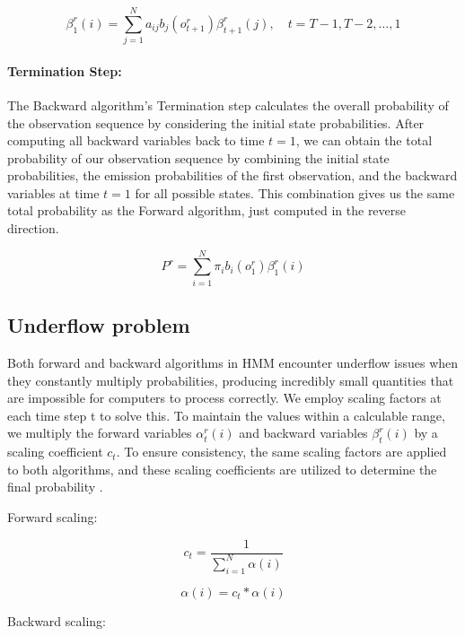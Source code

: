 \documentclass{article}
\begin{document}
\begin{equation}
\beta^r_1(i) = \sum^N_{j=1}a_{ij}b_j(o^r_{t+1})\beta^r_{t+1}(j), \quad t = T-1, T-2, \ldots, 1
\end{equation}


\paragraph{Termination Step:} The Backward algorithm's Termination step calculates the overall probability of the observation sequence by considering the initial state probabilities. After computing all backward variables back to time $t=1$, we can obtain the total probability of our observation sequence by combining the initial state probabilities, the emission probabilities of the first observation, and the backward variables at time $t=1$ for all possible states. This combination gives us the same total probability as the Forward algorithm, just computed in the reverse direction.


\begin{equation}
	P^r = \sum^N_{i=1}\pi_ib_i(o^r_1)\beta^r_1(i)
\end{equation}


\subsection{Underflow problem}

Both forward and backward algorithms in HMM encounter underflow issues when they constantly multiply probabilities, producing incredibly small quantities that are impossible for computers to process correctly. We employ scaling factors at each time step t to solve this. To maintain the values within a calculable range, we multiply the forward variables $\alpha^r_t(i)$ and backward variables $\beta^r_t(i)$ by a scaling coefficient $c_t$. To ensure consistency, the same scaling factors are applied to both algorithms, and these scaling coefficients are utilized to determine the final probability \citep{1162264}.

Forward scaling:

\begin{equation}
	c_t = \frac{1}{\sum^N_{i=1}\alpha(i)}
\end{equation}

\begin{equation}
	\alpha(i) = c_t * \alpha(i)
\end{equation}

Backward scaling:
\end{document}
